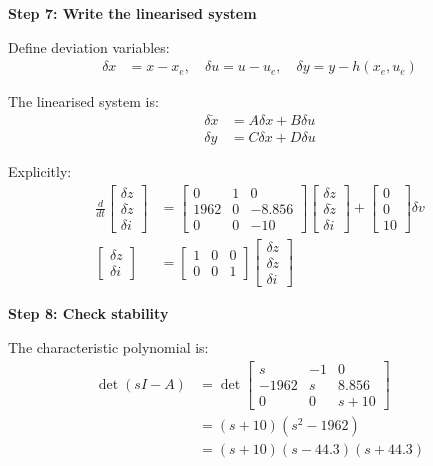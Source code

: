 \documentclass[11pt,a4paper]{article}
\begin{document}
\textbf{Step 7: Write the linearised system}

Define deviation variables:
\begin{align}
  \delta x &= x - x_e, \quad \delta u = u - u_e, \quad \delta y = y - h(x_e,u_e)
\end{align}

The linearised system is:
\begin{align}
  \delta\dot{x} &= A\delta x + B\delta u\\
  \delta y &= C\delta x + D\delta u
\end{align}

Explicitly:
\begin{align}
  \frac{d}{dt}\begin{bmatrix}
    \delta z\\
    \delta\dot{z}\\
    \delta i
  \end{bmatrix} &= \begin{bmatrix}
    0 & 1 & 0\\
    1962 & 0 & -8.856\\
    0 & 0 & -10
  \end{bmatrix}\begin{bmatrix}
    \delta z\\
    \delta\dot{z}\\
    \delta i
  \end{bmatrix} + \begin{bmatrix}
    0\\
    0\\
    10
  \end{bmatrix}\delta v\\
  \begin{bmatrix}
    \delta z\\
    \delta i
  \end{bmatrix} &= \begin{bmatrix}
    1 & 0 & 0\\
    0 & 0 & 1
  \end{bmatrix}\begin{bmatrix}
    \delta z\\
    \delta\dot{z}\\
    \delta i
  \end{bmatrix}
\end{align}

\textbf{Step 8: Check stability}

The characteristic polynomial is:
\begin{align}
  \det(sI - A) &= \det\begin{bmatrix}
    s & -1 & 0\\
    -1962 & s & 8.856\\
    0 & 0 & s+10
  \end{bmatrix}\\
  &= (s+10)(s^2 - 1962)\\
  &= (s+10)(s - 44.3)(s + 44.3)
\end{align}
\end{document}
